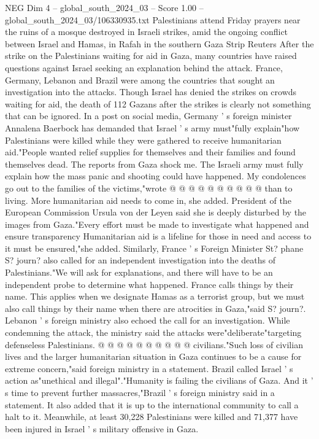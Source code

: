 \begin{textsample}{NEG Dim 4 – global\_south\_2024\_03 – Score 1.00 – global\_south\_2024\_03/106330935.txt}  \label{ex:f4_neg_353}
Palestinians attend Friday prayers near the ruins of a mosque destroyed in Israeli strikes, amid the ongoing conflict between Israel and Hamas, in Rafah in the southern Gaza Strip Reuters After the strike on the Palestinians waiting for aid in Gaza, many countries have raised questions against Israel seeking an explanation behind the attack.
France, Germany, Lebanon and Brazil were among the countries that sought an investigation into the attacks.
Though Israel has denied the strikes on crowds waiting for aid, the death of 112 Gazans after the strikes is clearly not something that can be ignored.
In a post on social media, Germany ' s foreign minister Annalena Baerbock has demanded that Israel ' s army must"fully explain"how Palestinians were killed while they were gathered to receive humanitarian aid."People wanted relief supplies for themselves and their families and found themselves dead.
The reports from Gaza shock me.
The Israeli army must fully explain how the mass panic and shooting could have happened.
My condolences go out to the families of the victims,"wrote @ @ @ @ @ @ @ @ @ @ than to living.
More humanitarian aid needs to come in, she added.
President of the European Commission Ursula von der Leyen said she is deeply disturbed by the images from Gaza."Every effort must be made to investigate what happened and ensure transparency Humanitarian aid is a lifeline for those in need and access to it must be ensured,"she added.
Similarly, France ' s Foreign Minister St? phane S? journ? also called for an independent investigation into the deaths of Palestinians."We will ask for explanations, and there will have to be an independent probe to determine what happened.
France calls things by their name.
This applies when we designate Hamas as a terrorist group, but we must also call things by their name when there are atrocities in Gaza,"said S? journ?.
Lebanon ' s foreign ministry also echoed the call for an investigation.
While condemning the attack, the ministry said the attacks were"deliberate"targeting defenseless Palestinians. @ @ @ @ @ @ @ @ @ @ civilians."Such loss of civilian lives and the larger humanitarian situation in Gaza continues to be a cause for extreme concern,"said foreign ministry in a statement.
Brazil called Israel ' s action as"unethical and illegal"."Humanity is failing the civilians of Gaza.
And it ' s time to prevent further massacres,"Brazil ' s foreign ministry said in a statement.
It also added that it is up to the international community to call a halt to it.
Meanwhile, at least 30,228 Palestinians were killed and 71,377 have been injured in Israel ' s military offensive in Gaza.

\end{textsample}
